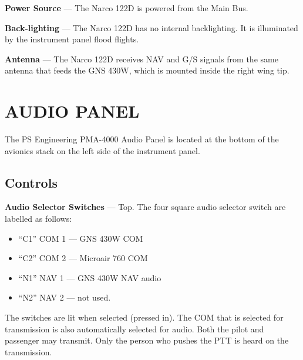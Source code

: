 \textbf{Power Source} --- The Narco 122D is powered from the Main Bus.

\textbf{Back-lighting} --- The Narco 122D has no internal backlighting.  It is illuminated by the instrument panel flood flights.

\textbf{Antenna} --- The Narco 122D receives NAV and G/S signals from the same antenna that feeds the GNS 430W, which is mounted inside the right wing tip.

{}
\section{AUDIO PANEL}

The PS Engineering PMA-4000 Audio Panel is located at the bottom of the avionics stack on the left side of the instrument panel.

\subsection*{Controls}

\textbf{Audio Selector Switches} --- Top. The four square audio selector switch are labelled as follows:
\begin{itemize}
\item ``C1'' COM 1 --- GNS 430W COM
\item ``C2'' COM 2 --- Microair 760 COM
\item ``N1'' NAV 1 --- GNS 430W NAV audio
\item ``N2'' NAV 2 --- not used.
\end{itemize}

The switches are lit when selected (pressed in). The COM that is selected for transmission is also automatically selected for audio. Both the pilot and passenger may transmit. Only the person who pushes the PTT is heard on the transmission.

